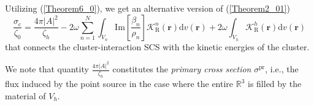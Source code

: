 \documentclass{article}
\begin{document}
Utilizing (\ref{Theorem6_0}), we get an alternative version of (\ref{Theorem2_01})
%
\begin{equation}\label{Theorem2_03}
    \frac{\sigma_{\mathrm{c}}}{\zeta_0}=\frac{4\pi\lvert A\rvert^2}{\zeta_h}-2\omega\sum_{n=1}^{N}\int_{V_n}\mathrm{Im}\left[\frac{\beta_n}{\rho_n}\right]\mathcal{K}_{\mathrm{R}}^n(\mathbf{r})\mathrm{d}v(\mathbf{r})+2\omega\int_{V_h}\mathcal{K}_{\mathrm{R}}^h(\mathbf{r})\mathrm{d}v(\mathbf{r})
\end{equation}
%
that connects the cluster-interaction SCS with the kinetic energies of the cluster. %

We note that quantity $\frac{4\pi\lvert A\rvert^2}{\zeta_h}$ constitutes the \emph{primary cross section} $\sigma^{\mathrm{pr}}$, i.e., the flux induced by the point source in the case where the entire $\mathbb{R}^3$ is filled by the material of $V_h$. 
\end{document}
